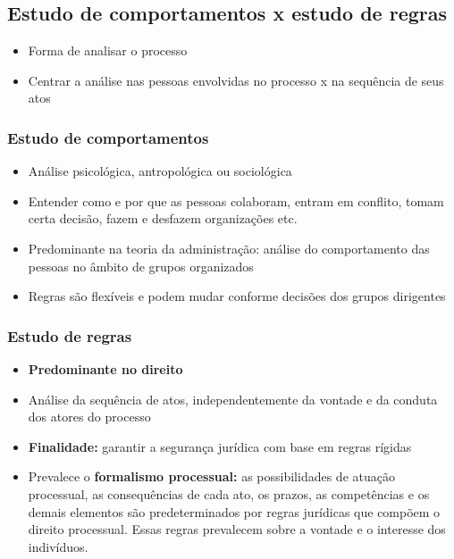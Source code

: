 \documentclass{article}
\begin{document}
\subsection{Estudo de comportamentos x estudo de regras}

\begin{itemize}
    \item Forma de analisar o processo
    \item Centrar a análise nas pessoas envolvidas no processo x na sequência de seus atos
\end{itemize}

\subsubsection{Estudo de comportamentos}

\begin{itemize}
    \item Análise psicológica, antropológica ou sociológica
    \item Entender como e por que as pessoas colaboram, entram em conflito, tomam certa decisão, fazem e desfazem organizações etc.
    \item Predominante na teoria da administração: análise do comportamento das pessoas no âmbito de grupos organizados
    \item Regras são flexíveis e podem mudar conforme decisões dos grupos dirigentes
\end{itemize}

\subsubsection{Estudo de regras}

\begin{itemize}
    \item \textbf{Predominante no direito}
    \item Análise da sequência de atos, independentemente da vontade e da conduta dos atores do processo
    \item \textbf{Finalidade:} garantir a segurança jurídica com base em regras rígidas
    \item Prevalece o \textbf{formalismo processual:} as possibilidades de atuação processual, as consequências de cada ato, os prazos, as competências e os demais elementos são predeterminados por regras jurídicas que compõem o direito processual. Essas regras prevalecem sobre a vontade e o interesse dos indivíduos.
\end{itemize}
\end{document}
